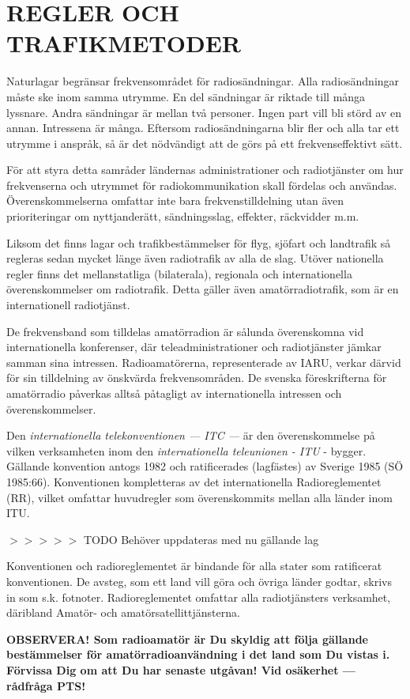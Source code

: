 \part{REGLER OCH TRAFIKMETODER}

Naturlagar begränsar frekvensområdet för radiosändningar. Alla
radiosändningar måste ske inom samma utrymme. En del sändningar är
riktade till många lyssnare. Andra sändningar är mellan två
personer. Ingen part vill bli störd av en annan. Intressena är
många. Eftersom radiosändningarna blir fler och alla tar ett utrymme i
anspråk, så är det nödvändigt att de görs på ett frekvenseffektivt
sätt.

För att styra detta samråder ländernas administrationer och
radiotjänster om hur frekvenserna och utrymmet för radiokommunikation
skall fördelas och användas.  Överenskommelserna omfattar inte bara
frekvenstilldelning utan även prioriteringar om nyttjanderätt,
sändningsslag, effekter, räckvidder m.m.

Liksom det finns lagar och trafikbestämmelser för flyg, sjöfart och
landtrafik så regleras sedan mycket länge även radiotrafik av alla de
slag. Utöver nationella regler finns det mellanstatliga (bilaterala),
regionala och internationella överenskommelser om radiotrafik. Detta
gäller även amatörradiotrafik, som är en internationell radiotjänst.

De frekvensband som tilldelas amatörradion är sålunda överenskomna vid
internationella konferenser, där teleadministrationer och
radiotjänster jämkar samman sina intressen. Radioamatörerna,
representerade av IARU, verkar därvid för sin tilldelning av önskvärda
frekvensområden. De svenska föreskrifterna för amatörradio påverkas
alltså påtagligt av internationella intressen och överenskommelser.

Den \emph{internationella telekonventionen --- ITC ---} är den
överenskommelse på vilken verksamheten inom den \emph{internationella
  teleunionen - ITU} - bygger. Gällande konvention antogs 1982 och
ratificerades (lagfästes) av Sverige 1985 (SÖ 1985:66). Konventionen
kompletteras av det internationella Radioreglementet (RR), vilket
omfattar huvudregler som överenskommits mellan alla länder inom ITU.

$>>>>>$ TODO Behöver uppdateras med nu gällande lag

Konventionen och radioreglementet är bindande för alla stater som
ratificerat konventionen. De avsteg, som ett land vill göra och övriga
länder godtar, skrivs in som s.k. fotnoter. Radioreglementet omfattar
alla radiotjänsters verksamhet, däribland Amatör- och
amatörsatellittjänsterna.

\textbf{OBSERVERA!  Som radioamatör är Du skyldig att följa gällande
  bestämmelser för amatörradioanvändning i det land som Du vistas i.
  Förvissa Dig om att Du har senaste utgåvan!  Vid osäkerhet ---
  rådfråga PTS!}
